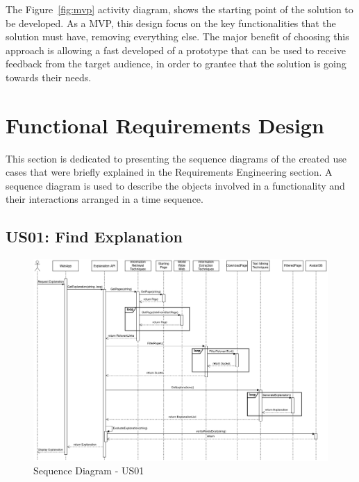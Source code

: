 The Figure~\ref{fig:mvp} activity diagram, shows the starting point of the solution to be developed.
As a \gls{MVP}, this design focus on the key functionalities that the solution must have, removing everything else.
The major benefit of choosing this approach is allowing a fast developed of a prototype that can be used to receive feedback from the target audience, in order to grantee that the solution is going towards their needs.

\section{Functional Requirements Design}

This section is dedicated to presenting the sequence diagrams of the created use cases that were briefly explained in the Requirements Engineering section.
A sequence diagram is used to describe the objects involved in a functionality and their interactions arranged in a time sequence.

\subsection{US01: Find Explanation}

\begin{figure}[H]
\centering
\includegraphics[width=\textwidth,keepaspectratio]{ch4/assets/US01_SD.png}
\caption[Sequence Diagram US01]{Sequence Diagram - US01}
\label{fig:sdus01}
\end{figure}

